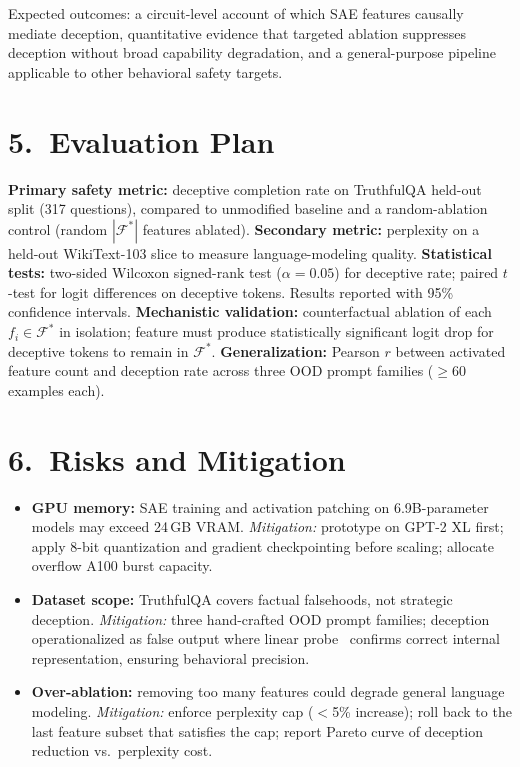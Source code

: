\documentclass[11pt]{article}
\begin{document}
Expected outcomes: a circuit-level account of which SAE features causally mediate deception, quantitative evidence that targeted ablation suppresses deception without broad capability degradation, and a general-purpose pipeline applicable to other behavioral safety targets.

\section*{5.~Evaluation Plan}

\textbf{Primary safety metric:} deceptive completion rate on TruthfulQA held-out split (317 questions), compared to unmodified baseline and a random-ablation control (random $|\mathcal{F}^*|$ features ablated). \textbf{Secondary metric:} perplexity on a held-out WikiText-103 slice to measure language-modeling quality. \textbf{Statistical tests:} two-sided Wilcoxon signed-rank test ($\alpha = 0.05$) for deceptive rate; paired $t$-test for logit differences on deceptive tokens. Results reported with 95\% confidence intervals. \textbf{Mechanistic validation:} counterfactual ablation of each $f_i \in \mathcal{F}^*$ in isolation; feature must produce statistically significant logit drop for deceptive tokens to remain in $\mathcal{F}^*$. \textbf{Generalization:} Pearson $r$ between activated feature count and deception rate across three OOD prompt families ($\geq$60 examples each).

\section*{6.~Risks and Mitigation}

\begin{itemize}
\item \textbf{GPU memory:} SAE training and activation patching on 6.9B-parameter models may exceed 24\,GB VRAM. \emph{Mitigation:} prototype on GPT-2 XL first; apply 8-bit quantization and gradient checkpointing before scaling; allocate overflow A100 burst capacity.
\item \textbf{Dataset scope:} TruthfulQA covers factual falsehoods, not strategic deception. \emph{Mitigation:} three hand-crafted OOD prompt families; deception operationalized as false output where linear probe~\cite{marks2023} confirms correct internal representation, ensuring behavioral precision.
\item \textbf{Over-ablation:} removing too many features could degrade general language modeling. \emph{Mitigation:} enforce perplexity cap ($<$5\% increase); roll back to the last feature subset that satisfies the cap; report Pareto curve of deception reduction vs.\ perplexity cost.
\end{itemize}
\end{document}
